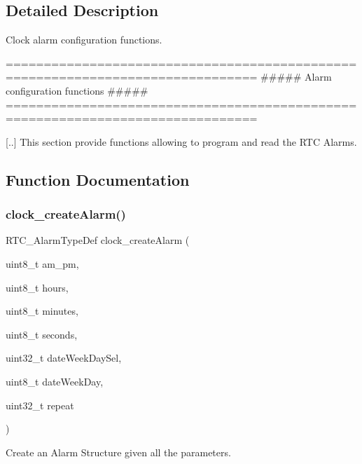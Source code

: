 \subsection{Detailed Description}
Clock alarm configuration functions. 

\begin{DoxyVerb} ===============================================================================
         ##### Alarm configuration functions #####
 ===============================================================================

 [..] This section provide functions allowing to program and read the RTC Alarms.\end{DoxyVerb}
 

\subsection{Function Documentation}
\mbox{\label{group___alarms_ga5e1614dbb1a210106dbade3f133db27e}} 
\subsubsection{\texorpdfstring{clock\+\_\+create\+Alarm()}{clock\_createAlarm()}}
{\footnotesize\ttfamily R\+T\+C\+\_\+\+Alarm\+Type\+Def clock\+\_\+create\+Alarm (\begin{DoxyParamCaption}\item[{uint8\+\_\+t}]{am\+\_\+pm,  }\item[{uint8\+\_\+t}]{hours,  }\item[{uint8\+\_\+t}]{minutes,  }\item[{uint8\+\_\+t}]{seconds,  }\item[{uint32\+\_\+t}]{date\+Week\+Day\+Sel,  }\item[{uint8\+\_\+t}]{date\+Week\+Day,  }\item[{uint32\+\_\+t}]{repeat }\end{DoxyParamCaption})}



Create an Alarm Structure given all the parameters. 



